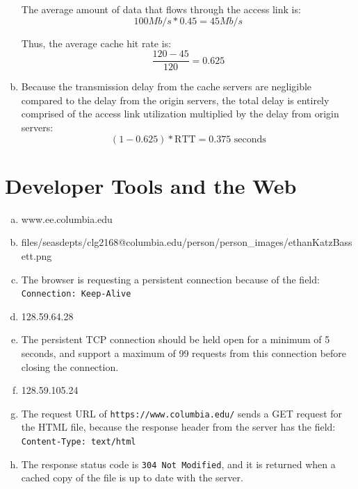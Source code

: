 \documentclass[11pt]{article}
\begin{document}
\begin{enumerate}[(a)]
      The average amount of data that flows through the access link is:
      \[ 100 Mb/s * 0.45 = 45 Mb/s \]

      Thus, the average cache hit rate is:
      \[ \frac{120 - 45}{120} = \boxed{0.625} \]
    \item
      Because the transmission delay from the cache servers are negligible compared
      to the delay from the origin servers, the total delay is entirely comprised
      of the access link utilization multiplied by the delay from origin servers:
      \[ (1 - 0.625) * \text{RTT} = \boxed{0.375 \text{ seconds}} \]
  \end{enumerate}

\section*{Developer Tools and the Web}
  \begin{enumerate}[(a)]
    \item
      www.ee.columbia.edu
    \item
      files/seasdepts/clg2168@columbia.edu/person/person\_images/ethanKatzBassett.png
    \item
      The browser is requesting a persistent connection because of the field:
      \texttt{Connection: Keep-Alive}
    \item
      128.59.64.28
    \item
      The persistent TCP connection should be held open for a minimum of 5 seconds,
      and support a maximum of 99 requests from this connection before closing
      the connection.
    \item
      128.59.105.24
    \item
      The request URL of \texttt{https://www.columbia.edu/} sends a GET request for
      the HTML file, because the response header from the server has the field:
      \texttt{Content-Type: text/html}
    \item
      The response status code is \texttt{304 Not Modified}, and it is returned when
      a cached copy of the file is up to date with the server.
  \end{enumerate}
\end{document}
